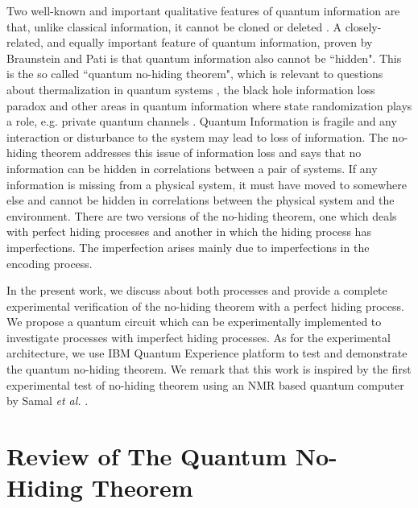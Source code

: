 Two well-known and important qualitative features of quantum information are that, unlike classical information, it cannot be cloned \cite{qnoh_no-cloning} or deleted \cite{qnoh_no-deleting}. A closely-related, and equally important feature of quantum information, proven by Braunstein and Pati \cite{qnoh_no-hiding} is that quantum information also cannot be ``hidden". This is the so called ``quantum no-hiding theorem", which is relevant to questions about thermalization in quantum systems \cite{qnoh_thermalization}, the black hole information loss paradox \cite{qnoh_HwakingNature1974} and other areas in quantum information where state randomization plays a role, e.g. private quantum channels \cite{qnoh_private}. Quantum Information is fragile and any interaction or disturbance to the system may lead to loss of information. The no-hiding theorem addresses this issue of information loss and says that no information can be hidden in correlations between a pair of systems. If any information is missing from a physical system, it must have moved to somewhere else and cannot be hidden in correlations between the physical system and the environment. There are two versions of the no-hiding theorem, one which deals with perfect hiding processes and another in which the hiding process has imperfections. The imperfection arises mainly due to imperfections in the encoding process. 

In the present work, we discuss about both processes and provide a complete experimental verification of the no-hiding theorem with a perfect hiding process. We propose a quantum circuit which can be experimentally implemented to investigate processes with imperfect hiding processes. As for the experimental architecture, we use IBM Quantum Experience platform to test and demonstrate the quantum no-hiding theorem. We remark that this work is inspired by the first experimental test of no-hiding theorem using an NMR based quantum computer by Samal \emph{et al.} \cite{qnoh_no-hiding-NMR}. 

\section{Review of The Quantum No-Hiding Theorem}
\label{qnoh_no-hiding-review-section}

